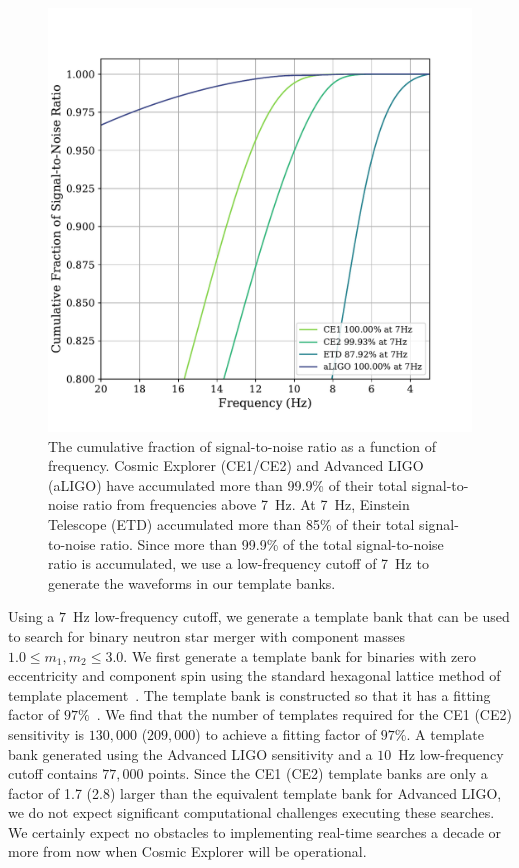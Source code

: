 \begin{figure}
    \includegraphics[width=1.1\columnwidth]{Figures/3G-bns-search-prospects/cumul-SNR-compcost.pdf}
    \caption{The cumulative fraction of signal-to-noise ratio as a function of frequency. Cosmic Explorer (CE1/CE2) and Advanced LIGO (aLIGO) have accumulated more than 99.9\% of their total signal-to-noise ratio from frequencies above 7~Hz. At 7~Hz, Einstein Telescope (ETD) accumulated more than 85\% of their total signal-to-noise ratio. Since more than 99.9\% of the total signal-to-noise ratio is accumulated, we use a low-frequency cutoff of 7~Hz to generate the waveforms in our template banks.}
\label{Fig:comp-cost-cumulSNR}
\end{figure}

Using a $7$~Hz low-frequency cutoff, we generate a template bank that can be used to search for binary neutron star merger with component masses $1.0 \leq m_1,m_2 \leq 3.0$. We first generate a template bank for binaries with zero eccentricity and component spin using the standard hexagonal lattice method of template placement~\cite{Owen:1995tm,Owen:1998dk,Cokelaer:2007kx,Brown:2012qf}. The template bank is constructed so that it has a fitting factor of $97\%$~\cite{Apostolatos:1995pj}. We find that the number of templates required for the CE1 (CE2) sensitivity is $130,000$ ($209,000$) to achieve a fitting factor of $97\%$. A template bank generated using the Advanced LIGO sensitivity and a $10$~Hz low-frequency cutoff contains $77,000$ points. Since the CE1 (CE2) template banks are only a factor of 1.7 (2.8) larger than the equivalent template bank for Advanced LIGO, we do not expect significant computational challenges executing these searches. We certainly expect no obstacles to implementing real-time searches a decade or more from now when Cosmic Explorer will be operational.

